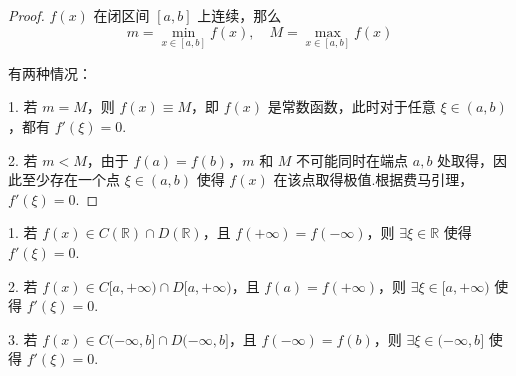 \begin{proof}
	\( f(x) \) 在闭区间 \([a, b]\) 上连续，那么
	\[
	m = \min_{x \in [a, b]} f(x), \quad M = \max_{x \in [a, b]} f(x)
	\]
	
	有两种情况：
	
	1. 若 \( m = M \)，则 \( f(x) \equiv M \)，即 \( f(x) \) 是常数函数，此时对于任意 \(\xi \in (a, b)\)，都有 \( f'(\xi) = 0 \).
	
	2. 若 \( m < M \)，由于 \( f(a) = f(b) \)，\( m \) 和 \( M \) 不可能同时在端点 \( a, b \) 处取得，因此至少存在一个点 \(\xi \in (a, b)\) 使得 \( f(x) \) 在该点取得极值.根据费马引理，\( f'(\xi) = 0 \).
\end{proof}
\begin{corollary}
	
	1. 若 \( f(x) \in C(\mathbb{R}) \cap D(\mathbb{R}) \)，且 \( f(+\infty) = f(-\infty) \)，则 \(\exists \xi \in \mathbb{R}\) 使得 \( f'(\xi) = 0 \).
	
	2. 若 \( f(x) \in C[a, +\infty) \cap D[a, +\infty) \)，且 \( f(a) = f(+\infty) \)，则 \(\exists \xi \in [a, +\infty) \) 使得 \( f'(\xi) = 0 \).
	
	3. 若 \( f(x) \in C(-\infty, b] \cap D(-\infty, b] \)，且 \( f(-\infty) = f(b) \)，则 \(\exists \xi \in (-\infty, b] \) 使得 \( f'(\xi) = 0 \).
	
	
\end{corollary}

